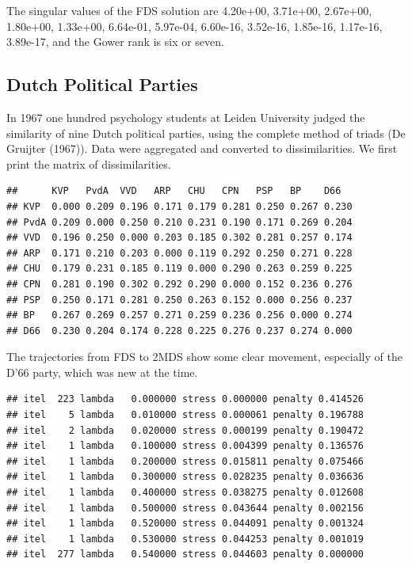 \documentclass[
  12pt,
]{article}
\begin{document}
The singular values of the FDS solution are 4.20e+00, 3.71e+00,
2.67e+00, 1.80e+00, 1.33e+00, 6.64e-01, 5.97e-04, 6.60e-16, 3.52e-16,
1.85e-16, 1.17e-16, 3.89e-17, and the Gower rank is six or seven.

\subsection{Dutch Political Parties}\label{dutch-political-parties}

In 1967 one hundred psychology students at Leiden University judged the
similarity of nine Dutch political parties, using the complete method of
triads (De Gruijter (1967)). Data were aggregated and converted to
dissimilarities. We first print the matrix of dissimilarities.

\begin{verbatim}
##      KVP   PvdA  VVD   ARP   CHU   CPN   PSP   BP    D66  
## KVP  0.000 0.209 0.196 0.171 0.179 0.281 0.250 0.267 0.230
## PvdA 0.209 0.000 0.250 0.210 0.231 0.190 0.171 0.269 0.204
## VVD  0.196 0.250 0.000 0.203 0.185 0.302 0.281 0.257 0.174
## ARP  0.171 0.210 0.203 0.000 0.119 0.292 0.250 0.271 0.228
## CHU  0.179 0.231 0.185 0.119 0.000 0.290 0.263 0.259 0.225
## CPN  0.281 0.190 0.302 0.292 0.290 0.000 0.152 0.236 0.276
## PSP  0.250 0.171 0.281 0.250 0.263 0.152 0.000 0.256 0.237
## BP   0.267 0.269 0.257 0.271 0.259 0.236 0.256 0.000 0.274
## D66  0.230 0.204 0.174 0.228 0.225 0.276 0.237 0.274 0.000
\end{verbatim}

The trajectories from FDS to 2MDS show some clear movement, especially
of the D'66 party, which was new at the time.

\begin{verbatim}
## itel  223 lambda   0.000000 stress 0.000000 penalty 0.414526 
## itel    5 lambda   0.010000 stress 0.000061 penalty 0.196788 
## itel    2 lambda   0.020000 stress 0.000199 penalty 0.190472 
## itel    1 lambda   0.100000 stress 0.004399 penalty 0.136576 
## itel    1 lambda   0.200000 stress 0.015811 penalty 0.075466 
## itel    1 lambda   0.300000 stress 0.028235 penalty 0.036636 
## itel    1 lambda   0.400000 stress 0.038275 penalty 0.012608 
## itel    1 lambda   0.500000 stress 0.043644 penalty 0.002156 
## itel    1 lambda   0.520000 stress 0.044091 penalty 0.001324 
## itel    1 lambda   0.530000 stress 0.044253 penalty 0.001019 
## itel  277 lambda   0.540000 stress 0.044603 penalty 0.000000
\end{verbatim}
\end{document}
